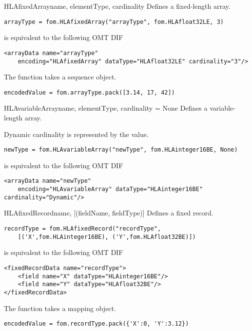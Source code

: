 \begin{classdesc}{HLAfixedArray}{name, elementType, cardinality}
Defines a fixed-length array.

\begin{verbatim}
arrayType = fom.HLAfixedArray("arrayType", fom.HLAfloat32LE, 3)
\end{verbatim}
is equivalent to the following OMT DIF
\begin{verbatim}
<arrayData name="arrayType"
    encoding="HLAfixedArray" dataType="HLAfloat32LE" cardinality="3"/>
\end{verbatim}

The  function takes a sequence object.
\begin{verbatim}
encodedValue = fom.arrayType.pack([3.14, 17, 42])
\end{verbatim}
\end{classdesc}

\begin{classdesc}{HLAvariableArray}{name, elementType, cardinality = None}
Defines a variable-length array.

Dynamic cardinality is represented by the  value.

\begin{verbatim}
newType = fom.HLAvariableArray("newType", fom.HLAinteger16BE, None)
\end{verbatim}
is equivalent to the following OMT DIF
\begin{verbatim}
<arrayData name="newType"
    encoding="HLAvariableArray" dataType="HLAinteger16BE" cardinality="Dynamic"/>
\end{verbatim}
\end{classdesc}

\begin{classdesc}{HLAfixedRecord}{name, [(fieldName, fieldType)]}
Defines a fixed record.

\begin{verbatim}
recordType = fom.HLAfixedRecord("recordType",
    [('X',fom.HLAinteger16BE), ('Y',fom.HLAfloat32BE)])
\end{verbatim}
is equivalent to the following OMT DIF
\begin{verbatim}
<fixedRecordData name="recordType">
    <field name="X" dataType="HLAinteger16BE"/>
    <field name="Y" dataType="HLAfloat32BE"/>
</fixedRecordData>
\end{verbatim}

The  function takes a mapping object.
\begin{verbatim}
encodedValue = fom.recordType.pack({'X':0, 'Y':3.12})
\end{verbatim}
\end{classdesc}

